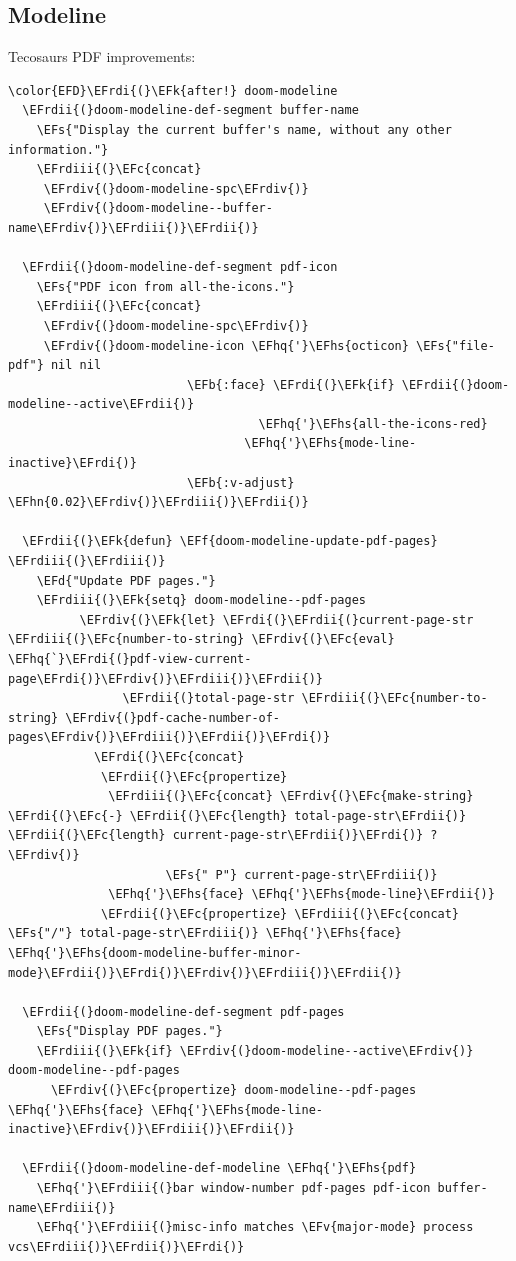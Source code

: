 \documentclass{scrartcl}
\newcommand{\EFk}[1]{\textcolor{EFk}{#1}} %
\newcommand{\EFd}[1]{\textcolor{EFd}{#1}} %
\newcommand{\EFs}[1]{\textcolor{EFs}{#1}} %
\newcommand{\EFb}[1]{\textcolor{EFb}{#1}} %
\newcommand{\EFc}[1]{\textcolor{EFc}{#1}} %
\newcommand{\EFv}[1]{\textcolor{EFv}{#1}} %
\newcommand{\EFf}[1]{\textcolor{EFf}{#1}} %
\newcommand{\EFhn}[1]{#1} %
\newcommand{\EFhq}[1]{#1} %
\newcommand{\EFhs}[1]{#1} %
\newcommand{\EFrdi}[1]{#1} %
\newcommand{\EFrdii}[1]{#1} %
\newcommand{\EFrdiii}[1]{#1} %
\newcommand{\EFrdiv}[1]{#1} %
\begin{document}
\subsection{Modeline}
\label{sec:org2b7c32f}
Tecosaurs PDF improvements:
\begin{Code}
\begin{Verbatim}[]
\color{EFD}\EFrdi{(}\EFk{after!} doom-modeline
  \EFrdii{(}doom-modeline-def-segment buffer-name
    \EFs{"Display the current buffer's name, without any other information."}
    \EFrdiii{(}\EFc{concat}
     \EFrdiv{(}doom-modeline-spc\EFrdiv{)}
     \EFrdiv{(}doom-modeline--buffer-name\EFrdiv{)}\EFrdiii{)}\EFrdii{)}

  \EFrdii{(}doom-modeline-def-segment pdf-icon
    \EFs{"PDF icon from all-the-icons."}
    \EFrdiii{(}\EFc{concat}
     \EFrdiv{(}doom-modeline-spc\EFrdiv{)}
     \EFrdiv{(}doom-modeline-icon \EFhq{'}\EFhs{octicon} \EFs{"file-pdf"} nil nil
                         \EFb{:face} \EFrdi{(}\EFk{if} \EFrdii{(}doom-modeline--active\EFrdii{)}
                                   \EFhq{'}\EFhs{all-the-icons-red}
                                 \EFhq{'}\EFhs{mode-line-inactive}\EFrdi{)}
                         \EFb{:v-adjust} \EFhn{0.02}\EFrdiv{)}\EFrdiii{)}\EFrdii{)}

  \EFrdii{(}\EFk{defun} \EFf{doom-modeline-update-pdf-pages} \EFrdiii{(}\EFrdiii{)}
    \EFd{"Update PDF pages."}
    \EFrdiii{(}\EFk{setq} doom-modeline--pdf-pages
          \EFrdiv{(}\EFk{let} \EFrdi{(}\EFrdii{(}current-page-str \EFrdiii{(}\EFc{number-to-string} \EFrdiv{(}\EFc{eval} \EFhq{`}\EFrdi{(}pdf-view-current-page\EFrdi{)}\EFrdiv{)}\EFrdiii{)}\EFrdii{)}
                \EFrdii{(}total-page-str \EFrdiii{(}\EFc{number-to-string} \EFrdiv{(}pdf-cache-number-of-pages\EFrdiv{)}\EFrdiii{)}\EFrdii{)}\EFrdi{)}
            \EFrdi{(}\EFc{concat}
             \EFrdii{(}\EFc{propertize}
              \EFrdiii{(}\EFc{concat} \EFrdiv{(}\EFc{make-string} \EFrdi{(}\EFc{-} \EFrdii{(}\EFc{length} total-page-str\EFrdii{)} \EFrdii{(}\EFc{length} current-page-str\EFrdii{)}\EFrdi{)} ? \EFrdiv{)}
                      \EFs{" P"} current-page-str\EFrdiii{)}
              \EFhq{'}\EFhs{face} \EFhq{'}\EFhs{mode-line}\EFrdii{)}
             \EFrdii{(}\EFc{propertize} \EFrdiii{(}\EFc{concat} \EFs{"/"} total-page-str\EFrdiii{)} \EFhq{'}\EFhs{face} \EFhq{'}\EFhs{doom-modeline-buffer-minor-mode}\EFrdii{)}\EFrdi{)}\EFrdiv{)}\EFrdiii{)}\EFrdii{)}

  \EFrdii{(}doom-modeline-def-segment pdf-pages
    \EFs{"Display PDF pages."}
    \EFrdiii{(}\EFk{if} \EFrdiv{(}doom-modeline--active\EFrdiv{)} doom-modeline--pdf-pages
      \EFrdiv{(}\EFc{propertize} doom-modeline--pdf-pages \EFhq{'}\EFhs{face} \EFhq{'}\EFhs{mode-line-inactive}\EFrdiv{)}\EFrdiii{)}\EFrdii{)}

  \EFrdii{(}doom-modeline-def-modeline \EFhq{'}\EFhs{pdf}
    \EFhq{'}\EFrdiii{(}bar window-number pdf-pages pdf-icon buffer-name\EFrdiii{)}
    \EFhq{'}\EFrdiii{(}misc-info matches \EFv{major-mode} process vcs\EFrdiii{)}\EFrdii{)}\EFrdi{)}
\end{Verbatim}
\end{Code}
\end{document}
